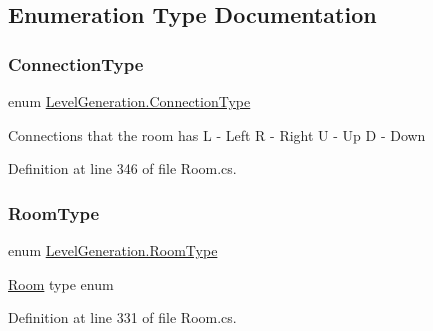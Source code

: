 \subsection{Enumeration Type Documentation}
\mbox{\label{namespace_level_generation_ac48934e101078b19dce3479d82f689e0}} 
\subsubsection{\texorpdfstring{Connection\+Type}{ConnectionType}}
{\footnotesize\ttfamily enum \mbox{\hyperlink{namespace_level_generation_ac48934e101078b19dce3479d82f689e0}{Level\+Generation.\+Connection\+Type}}\hspace{0.3cm}{\ttfamily [strong]}}



Connections that the room has L -\/ Left R -\/ Right U -\/ Up D -\/ Down 



Definition at line 346 of file Room.\+cs.

\mbox{\label{namespace_level_generation_a206451e0c8bfced86ae4b9348cd3718f}} 
\subsubsection{\texorpdfstring{Room\+Type}{RoomType}}
{\footnotesize\ttfamily enum \mbox{\hyperlink{namespace_level_generation_a206451e0c8bfced86ae4b9348cd3718f}{Level\+Generation.\+Room\+Type}}\hspace{0.3cm}{\ttfamily [strong]}}



\mbox{\hyperlink{class_level_generation_1_1_room}{Room}} type enum 



Definition at line 331 of file Room.\+cs.

